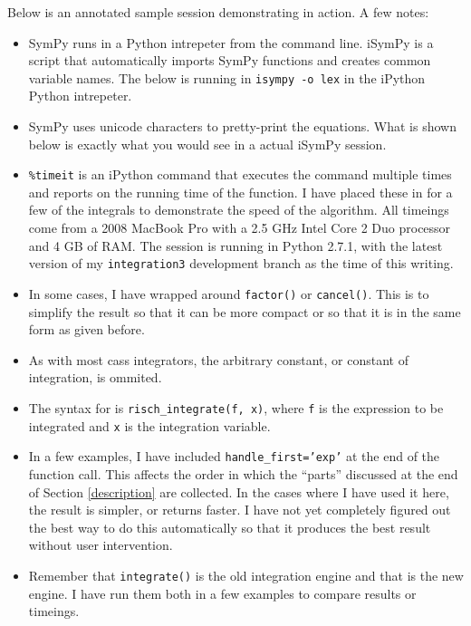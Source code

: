 Below is an annotated sample session demonstrating \rischintegrate{} in action.  A few notes:
\begin{itemize}
\item SymPy runs in a Python intrepeter from the command line.
iSymPy is a script that automatically imports SymPy functions and
creates common variable names.  The below is running in \texttt{isympy
-o lex} in the iPython Python intrepeter.

\item SymPy uses unicode characters to pretty-print the equations. 
What is shown below is exactly what you would see in a actual iSymPy
session.

\item \texttt{\%timeit} is an iPython command that executes the command
multiple times and reports on the running time of the function. I have
placed these in for a few of the integrals to demonstrate the speed of
the algorithm.  All timeings come from a 2008 MacBook Pro with a 2.5 GHz
Intel Core 2 Duo processor and 4 GB of RAM.  The session is running in
Python 2.7.1, with the latest version of my \texttt{integration3}
development branch as the time of this writing.  

\item In some cases, I have wrapped \rischintegrate{} around
\texttt{factor()} or \texttt{cancel()}.  This is to simplify the result
so that it can be more compact or so that it is in the same form as
given before.

\item As with most \glspl{cas} integrators, the arbitrary constant, or
constant of integration, is ommited.  

\item The syntax for \rischintegrate{} is \texttt{risch\_integrate(f, x)},
where \texttt{f} is the expression to be integrated and \texttt{x} is
the integration variable.

\item In a few examples, I have included \texttt{handle\_first='exp'} at
the end of the \rischintegrate{} function call.  This affects the order in
which the ``parts'' discussed at the end of Section \ref{description}
are collected.  In the cases where I have used it here, the result is
simpler, or returns faster.  I have not yet completely figured out the
best way to do this automatically so that it produces the best result
without user intervention.  

\item Remember that \texttt{integrate()} is the old \gls{integration}
engine and that \rischintegrate{} is the new engine.  I have run them both in a
few examples to compare results or timeings.  


\end{itemize}
